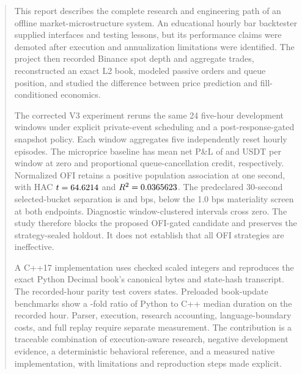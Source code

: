 \documentclass[11pt]{article}
\begin{document}
\hypersetup{pageanchor=true}
\begin{abstract}
This report describes the complete research and engineering path of an offline
market-microstructure system. An educational hourly bar backtester supplied
interfaces and testing lessons, but its performance claims were demoted after
execution and annualization limitations were identified. The project then
recorded Binance spot depth and aggregate trades, reconstructed an exact L2
book, modeled passive orders and queue position, and studied the difference
between price prediction and fill-conditioned economics.

The corrected V3 experiment reruns the same 24 five-hour development windows
under explicit private-event scheduling and a post-response-gated snapshot
policy. Each window aggregates five independently reset hourly episodes.
The microprice baseline has mean net P\&L of \VThreeMeanZero{} and
\VThreeMeanOne{} USDT per window at zero and proportional queue-cancellation
credit, respectively. Normalized OFI retains a positive population association
at one second, with HAC $t=\VThreeOFITStat$ and
$R^2=\VThreeOFIRSquared$. The predeclared 30-second selected-bucket separation
is \VThreeContrastZero{} and \VThreeContrastOne{} bps, below the 1.0 bps
materiality screen at both endpoints. Diagnostic window-clustered intervals
cross zero. The study therefore blocks the proposed OFI-gated candidate and
preserves the strategy-sealed holdout. It does not establish that all OFI
strategies are ineffective.

A C++17 implementation uses checked scaled integers and reproduces the exact
Python Decimal book's canonical bytes and state-hash transcript.
The recorded-hour parity test covers \NativeRecordedStates{} states.
Preloaded book-update benchmarks show a \NativeRecordedSpeedup{}-fold ratio of
Python to C++ median duration on the recorded hour. Parser, execution, research
accounting, language-boundary costs, and full replay require separate measurement.
The contribution is a traceable combination of execution-aware research,
negative development evidence, a deterministic behavioral reference, and a
measured native implementation, with limitations and reproduction steps made
explicit.
\end{abstract}
\tableofcontents
\clearpage
{}







\clearpage
\appendix

\clearpage


\end{document}
